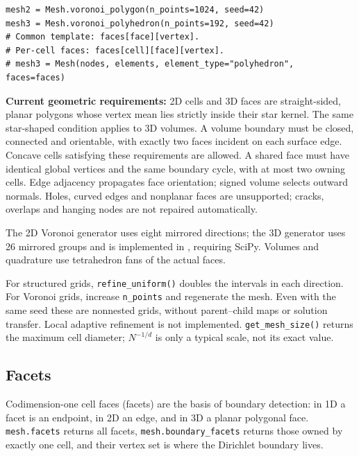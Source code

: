 \documentclass[11pt,oneside]{book}
\theoremstyle{definition}
\theoremstyle{plain}
\newcommand{\code}[1]{\texttt{#1}}
\begin{document}
\begin{lstlisting}[language=MosicaFE,caption={Polygonal and polyhedral mesh entry points}]
mesh2 = Mesh.voronoi_polygon(n_points=1024, seed=42)
mesh3 = Mesh.voronoi_polyhedron(n_points=192, seed=42)
# Common template: faces[face][vertex].
# Per-cell faces: faces[cell][face][vertex].
# mesh3 = Mesh(nodes, elements, element_type="polyhedron", faces=faces)
\end{lstlisting}

\textbf{Current geometric requirements:} 2D cells and 3D faces are straight-sided,
planar polygons whose vertex mean lies strictly inside their star kernel. The same
star-shaped condition applies to 3D volumes. A volume boundary must be closed,
connected and orientable, with exactly two faces incident on each surface edge.
Concave cells satisfying these requirements are allowed. A shared face must have
identical global vertices and the same boundary cycle, with at most two owning
cells. Edge adjacency propagates face orientation; signed volume selects outward
normals. Holes, curved edges and nonplanar faces are unsupported; cracks, overlaps
and hanging nodes are not repaired automatically.

The 2D Voronoi generator uses eight mirrored directions; the 3D generator uses
26 mirrored groups and is implemented in , requiring SciPy.
Volumes and quadrature use tetrahedron fans of the actual faces.

For structured grids, \code{refine\_\allowbreak uniform()} doubles the intervals in each
direction. For Voronoi grids, increase \code{n\_\allowbreak points} and regenerate the mesh.
Even with the same seed these are nonnested grids, without parent--child maps or
solution transfer. Local adaptive refinement is not implemented.
\code{get\_\allowbreak mesh\_\allowbreak size()} returns the maximum cell diameter; $N^{-1/d}$ is only a
typical scale, not its exact value.

\subsection{Facets}

Codimension-one cell faces (facets) are the basis of boundary detection: in 1D a
facet is an endpoint, in 2D an edge, and in 3D a planar polygonal face.
\code{mesh.facets} returns all facets, \code{mesh.boundary\_\allowbreak facets} returns those
owned by exactly one cell, and their vertex set is where the Dirichlet boundary
lives.
\end{document}
